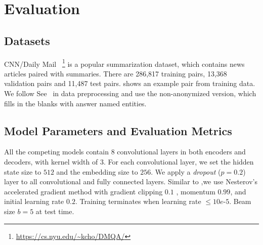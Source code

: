 \section{Evaluation}
\label{sec:eval}

\subsection{Datasets}
CNN/Daily Mail~\cite{HermannKGEKSB15}
\footnote{\url{https://cs.nyu.edu/~kcho/DMQA/}} 
is a popular summarization dataset, 
which contains news articles paired with summaries.
There are 286,817 training pairs,
13,368 validation pairs and 11,487 test pairs.
 shows an example pair from training data.
We follow See~\cite{SeeLM17} in data preprocessing and use 
the non-anonymized version, which fills in the blanks with answer named entities.


\subsection{Model Parameters and Evaluation Metrics}
\label{sec:expset}
All the competing models contain $8$ convolutional layers in
both encoders and decoders, with kernel width of $3$.
For each convolutional layer, 
we set the hidden state size to $512$ and the embedding size to $256$.
We apply a \textit{dropout} ($p=0.2$) layer to 
all convolutional and fully connected layers.
Similar to \cite{gehring2017convs2s},we use Nesterov's
accelerated gradient method \DIFaddbegin {}\DIFaddend with gradient clipping $0.1$ \DIFaddbegin {}\DIFaddend , momentum $0.99$,
and initial learning rate $0.2$.
Training terminates when learning rate $\le 10e$-$5$.
Beam size $b=5$ at test time.

